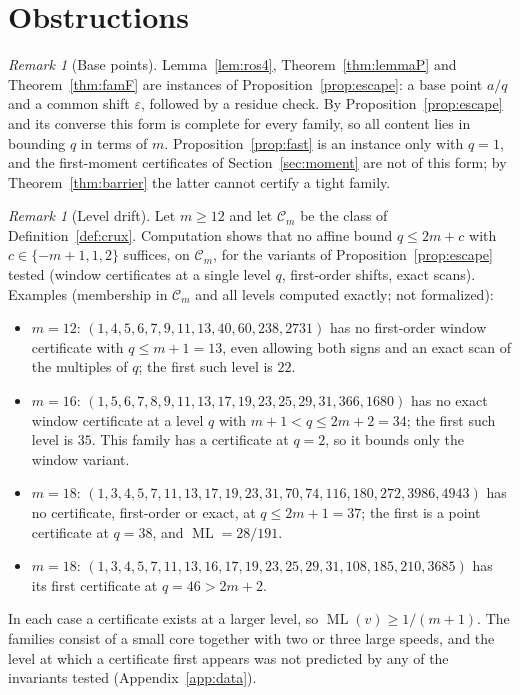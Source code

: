 \documentclass[11pt]{amsart}
\theoremstyle{plain}
\theoremstyle{definition}
\theoremstyle{remark}
\newtheorem{remark}[theorem]{Remark}
\newcommand{\ML}{\operatorname{ML}}
\begin{document}
\section{Obstructions}\label{sec:obstruction}

\begin{remark}[Base points]
Lemma~\ref{lem:ros4}, Theorem~\ref{thm:lemmaP} and Theorem~\ref{thm:famF} are instances of
Proposition~\ref{prop:escape}: a base point $a/q$ and a common shift $\varepsilon$, followed by a
residue check. By Proposition~\ref{prop:escape} and its converse this form is complete for every
family, so all content lies in bounding $q$ in terms of $m$. Proposition~\ref{prop:fast} is an
instance only with $q=1$, and the first-moment certificates of Section~\ref{sec:moment} are not
of this form; by Theorem~\ref{thm:barrier} the latter cannot certify a tight family.
\end{remark}

\begin{remark}[Level drift]
Let $m\ge12$ and let $\mathcal C_m$ be the class of Definition~\ref{def:crux}. Computation shows
that no affine bound $q\le 2m+c$ with $c\in\{-m+1,1,2\}$ suffices, on $\mathcal C_m$, for
the variants of Proposition~\ref{prop:escape} tested (window certificates at a single level
$q$, first-order shifts, exact scans). Examples (membership in
$\mathcal C_m$ and all levels computed exactly; not formalized):
\begin{itemize}
\item $m=12$: $(1,4,5,6,7,9,11,13,40,60,238,2731)$ has no first-order window certificate with
$q\le m+1=13$, even allowing both signs and an exact scan of the multiples of $q$; the first such
level is $22$.
\item $m=16$: $(1,5,6,7,8,9,11,13,17,19,23,25,29,31,366,1680)$ has no exact window certificate
at a level $q$ with $m+1<q\le 2m+2=34$; the first such level is $35$. This family has a
certificate at $q=2$, so it bounds only the window variant.
\item $m=18$: $(1,3,4,5,7,11,13,17,19,23,31,70,74,116,180,272,3986,4943)$ has no certificate,
first-order or exact, at $q\le 2m+1=37$; the first is a point certificate at $q=38$, and
$\ML=28/191$.
\item $m=18$: $(1,3,4,5,7,11,13,16,17,19,23,25,29,31,108,185,210,3685)$ has its first
certificate at $q=46>2m+2$.
\end{itemize}
In each case a certificate exists at a larger level, so $\ML(v)\ge1/(m+1)$. The families
consist of a small core together with two or three large speeds, and the level at which a
certificate first appears was not predicted by any of the invariants tested
(Appendix~\ref{app:data}).
\end{remark}
\end{document}
